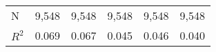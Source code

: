 \begin{tabular}{llllll}
\midrule N                                    &                                    9,548 &                                    9,548 &                                    9,548 &                                    9,548 &                                    9,548 \\
$R^2$                                         &                                    0.069 &                                    0.067 &                                    0.045 &                                    0.046 &                                    0.040 \\
\bottomrule
\end{tabular}
